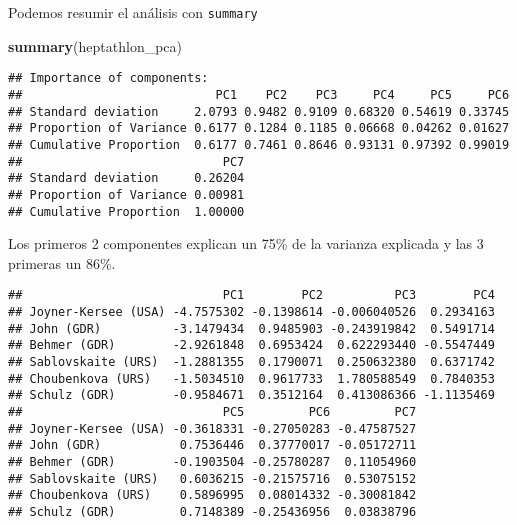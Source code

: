\documentclass[]{article}
\newenvironment{Shaded}{\begin{snugshade}}{\end{snugshade}}
\newcommand{\KeywordTok}[1]{\textcolor[rgb]{0.13,0.29,0.53}{\textbf{{#1}}}}
\newcommand{\DecValTok}[1]{\textcolor[rgb]{0.00,0.00,0.81}{{#1}}}
\newcommand{\StringTok}[1]{\textcolor[rgb]{0.31,0.60,0.02}{{#1}}}
\newcommand{\NormalTok}[1]{{#1}}
\numberwithin{equation}{section}
\begin{document}
\begin{Shaded}
\end{Shaded}

Podemos resumir el análisis con \texttt{summary}

\begin{Shaded}
\begin{Highlighting}[]
\KeywordTok{summary}\NormalTok{(heptathlon_pca)}
\end{Highlighting}
\end{Shaded}

\begin{verbatim}
## Importance of components:
##                           PC1    PC2    PC3     PC4     PC5     PC6
## Standard deviation     2.0793 0.9482 0.9109 0.68320 0.54619 0.33745
## Proportion of Variance 0.6177 0.1284 0.1185 0.06668 0.04262 0.01627
## Cumulative Proportion  0.6177 0.7461 0.8646 0.93131 0.97392 0.99019
##                            PC7
## Standard deviation     0.26204
## Proportion of Variance 0.00981
## Cumulative Proportion  1.00000
\end{verbatim}

Los primeros 2 componentes explican un 75\% de la varianza explicada y
las 3 primeras un 86\%.

\begin{Shaded}
\end{Shaded}

\begin{verbatim}
##                            PC1        PC2          PC3        PC4
## Joyner-Kersee (USA) -4.7575302 -0.1398614 -0.006040526  0.2934163
## John (GDR)          -3.1479434  0.9485903 -0.243919842  0.5491714
## Behmer (GDR)        -2.9261848  0.6953424  0.622293440 -0.5547449
## Sablovskaite (URS)  -1.2881355  0.1790071  0.250632380  0.6371742
## Choubenkova (URS)   -1.5034510  0.9617733  1.780588549  0.7840353
## Schulz (GDR)        -0.9584671  0.3512164  0.413086366 -1.1135469
##                            PC5         PC6         PC7
## Joyner-Kersee (USA) -0.3618331 -0.27050283 -0.47587527
## John (GDR)           0.7536446  0.37770017 -0.05172711
## Behmer (GDR)        -0.1903504 -0.25780287  0.11054960
## Sablovskaite (URS)   0.6036215 -0.21575716  0.53075152
## Choubenkova (URS)    0.5896995  0.08014332 -0.30081842
## Schulz (GDR)         0.7148389 -0.25436956  0.03838796
\end{verbatim}
\end{document}
